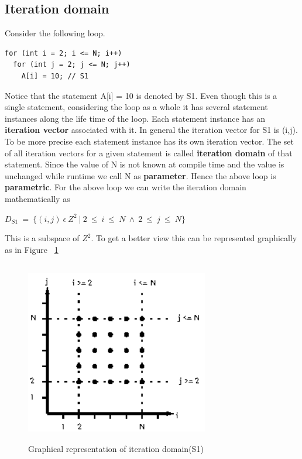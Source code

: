 \subsection{Iteration domain}
Consider the following loop.
{\footnotesize
\begin{lstlisting}
for (int i = 2; i <= N; i++)
  for (int j = 2; j <= N; j++)
    A[i] = 10; // S1
\end{lstlisting}
}
Notice that the statement A[i] = 10 is denoted by S1. Even though this is a single statement, considering
the loop as a whole it has several statement instances along the life time of the loop. Each statement
instance has an \textbf{iteration vector} associated with it. In general the iteration vector for S1 is (i,j).
To be more precise each statement instance has its own iteration vector. The set of all iteration vectors
for a given statement is called \textbf{iteration domain} of that statement. Since the value of N
is not known at compile time and the value is unchanged while runtime we call N as \textbf{parameter}.
Hence the above loop is \textbf{parametric}. For the above loop we can write the iteration domain mathematically as
\begin{center}
$D_{S1}\ =\ \{(i,j)\ \epsilon\ Z^2\ |\ 2\ \leq\ i\ \leq\ N\ \wedge\ 2\ \leq\ j\ \leq\ N\}$
\end{center}
This is a subspace of $Z^2$. To get a better view this can be represented graphically as in Figure ~\ref{fig:iter}
\begin{figure}
\begin{center}
  \includegraphics[height=8cm,width=8cm]{images/iter.eps}
  \caption{Graphical representation of iteration domain(S1)}
  \label{fig:iter}
\end{center}  
\end{figure}

